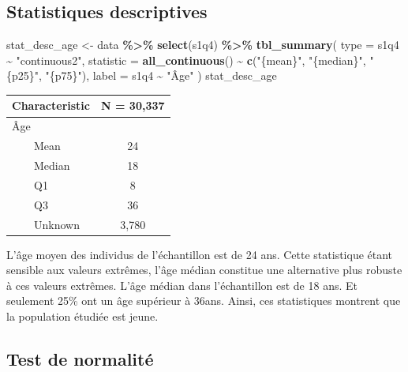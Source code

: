 \documentclass[
]{article}
\newenvironment{Shaded}{\begin{snugshade}}{\end{snugshade}}
\newcommand{\AttributeTok}[1]{\textcolor[rgb]{0.13,0.29,0.53}{#1}}
\newcommand{\FunctionTok}[1]{\textcolor[rgb]{0.13,0.29,0.53}{\textbf{#1}}}
\newcommand{\NormalTok}[1]{#1}
\newcommand{\OtherTok}[1]{\textcolor[rgb]{0.56,0.35,0.01}{#1}}
\newcommand{\SpecialCharTok}[1]{\textcolor[rgb]{0.81,0.36,0.00}{\textbf{#1}}}
\newcommand{\StringTok}[1]{\textcolor[rgb]{0.31,0.60,0.02}{#1}}
\begin{document}
\subsection{Statistiques descriptives}\label{statistiques-descriptives}

\begin{Shaded}
\begin{Highlighting}[]
\NormalTok{stat\_desc\_age }\OtherTok{\textless{}{-}}\NormalTok{ data }\SpecialCharTok{\%\textgreater{}\%} 
  \FunctionTok{select}\NormalTok{(s1q4) }\SpecialCharTok{\%\textgreater{}\%}
  \FunctionTok{tbl\_summary}\NormalTok{(}
    \AttributeTok{type =}\NormalTok{ s1q4 }\SpecialCharTok{\textasciitilde{}} \StringTok{"continuous2"}\NormalTok{,}
    \AttributeTok{statistic =} \FunctionTok{all\_continuous}\NormalTok{() }\SpecialCharTok{\textasciitilde{}} \FunctionTok{c}\NormalTok{(}\StringTok{"\{mean\}"}\NormalTok{, }\StringTok{"\{median\}"}\NormalTok{, }\StringTok{"\{p25\}"}\NormalTok{, }\StringTok{"\{p75\}"}\NormalTok{),}
    \AttributeTok{label =}\NormalTok{ s1q4 }\SpecialCharTok{\textasciitilde{}} \StringTok{"Âge"}
\NormalTok{  )}
\NormalTok{stat\_desc\_age}
\end{Highlighting}
\end{Shaded}

\begin{table}[t]
\fontsize{12.0pt}{14.0pt}\selectfont
\begin{tabular*}{\linewidth}{@{\extracolsep{\fill}}lc}
\toprule
\textbf{Characteristic} & \textbf{N = 30,337} \\ 
\midrule\addlinespace[2.5pt]
Âge &  \\ 
    Mean & 24 \\ 
    Median & 18 \\ 
    Q1 & 8 \\ 
    Q3 & 36 \\ 
    Unknown & 3,780 \\ 
\bottomrule
\end{tabular*}
\end{table}

L'âge moyen des individus de l'échantillon est de 24 ans. Cette
statistique étant sensible aux valeurs extrêmes, l'âge médian constitue
une alternative plus robuste à ces valeurs extrêmes. L'âge médian dans
l'échantillon est de 18 ans. Et seulement 25\% ont un âge supérieur à
36ans. Ainsi, ces statistiques montrent que la population étudiée est
jeune.

\subsection{Test de normalité}\label{test-de-normalituxe9}
\end{document}

